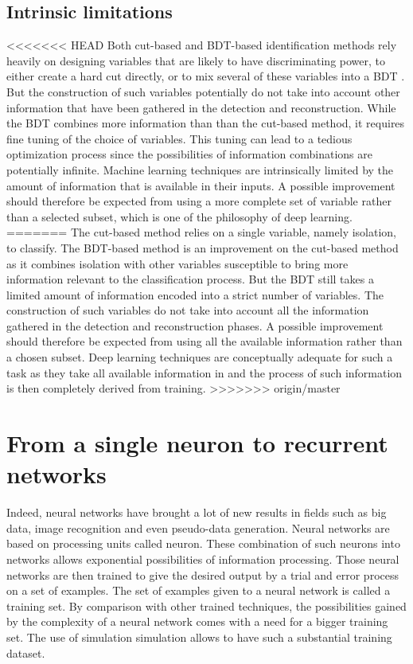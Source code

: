 \subsection{Intrinsic limitations}

<<<<<<< HEAD
Both cut-based and BDT-based identification methods rely heavily on designing variables that are likely to have discriminating power, to either create a hard cut directly, or to mix several of these variables into a BDT . But the construction of such variables potentially do not take into account other information that have been gathered in the detection and reconstruction.
While the BDT combines more information than than the cut-based method, it requires fine tuning of the choice of variables. This tuning can lead to a tedious optimization process since the possibilities of information combinations are potentially infinite. Machine learning techniques are intrinsically limited by the amount of information that is available in their inputs. 
A possible improvement should therefore be expected from using a more complete set of variable rather than a selected subset, which is one of the philosophy of deep learning.
=======
The cut-based method relies on a single variable, namely isolation, to classify. The BDT-based method is an improvement on the cut-based method as it combines isolation with other variables susceptible to bring more information relevant to the classification process. But the BDT still takes a limited amount of information encoded into a strict number of variables. The construction of such variables do not take into account all the information gathered in the detection and reconstruction phases. A possible improvement should therefore be expected from using all the available information rather than a chosen subset. Deep learning techniques are conceptually adequate for such a task as they take all available information in and the process of such information is then completely derived from training.
>>>>>>> origin/master


\section{From a single neuron to recurrent networks}
\label{sec:NN}
Indeed, neural networks have brought a lot of new results in fields such as big data, image recognition and even pseudo-data generation.
Neural networks are based on processing units called neuron. These combination of such neurons into networks allows exponential possibilities of information processing. Those neural networks are then trained to give the desired output by a trial and error process on a set of examples. The set of examples given to a neural network is called a training set. By comparison with other trained techniques, the possibilities gained by the complexity of a neural network comes with a need for a bigger training set. The use of simulation simulation allows to have such a substantial training dataset.

